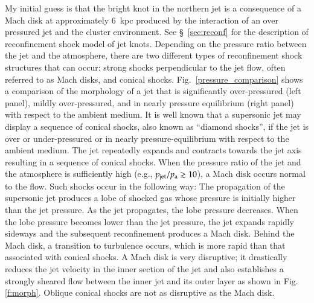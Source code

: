 
My initial guess is that the bright knot in the northern jet is a consequence of a Mach disk at approximately 6~kpc produced by the interaction of an over pressured jet and the cluster environment. See \S~\ref{sec:reconf} for the description of reconfinement shock model of jet knots. Depending on the pressure ratio between the jet and the atmosphere, there are two different types of reconfinement shock structures that can occur: strong shocks perpendicular to the jet flow, often referred to as Mach disks, and conical shocks. Fig.~\ref{pressure_comparison} shows a comparison of the morphology of a jet that is significantly over-pressured (left panel), mildly over-pressured, and in nearly pressure equilibrium (right panel) with respect to the ambient medium. It is well known that a supersonic jet may display a sequence of conical shocks, also known as ``diamond shocks'', if the jet is over or under-pressured or in nearly pressure-equilibrium with respect to the ambient medium. The jet repeatedly expands and contracts towards the jet axis resulting in a sequence of conical shocks. When the pressure ratio of the jet and the atmosphere is sufficiently high (e.g., $p_{\rm{jet}}/p_{\rm{a}}\gtrsim10$), a Mach disk occurs normal to the flow. Such shocks occur in the following way: The propagation of the supersonic jet produces a lobe of shocked gas whose pressure is initially higher than the jet pressure. As the jet propagates, the lobe pressure decreases. When the lobe pressure becomes lower than the jet pressure, the jet expands rapidly sideways and the subsequent reconfinement produces a Mach disk. Behind the Mach disk, a transition to turbulence occurs, which is more rapid than that associated with conical shocks. A Mach disk is very disruptive; it drastically reduces the jet velocity in the inner section of the jet and also establishes a strongly sheared flow between the inner jet and its outer layer as shown in Fig. \ref{f:morph}. Oblique conical shocks are not as disruptive as the Mach disk. 

